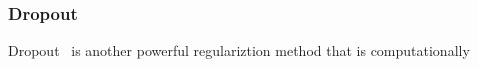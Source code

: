 \subsubsection{Dropout}

Dropout~\cite{JMLR:v15:srivastava14a} is another powerful regulariztion method that is computationally 